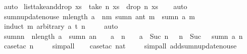 \begin{isabellebody}
\ auto%
\endisatagproof
{\isafoldproof}%
%
\isadelimproof
\isanewline
%
\endisadelimproof
\isanewline
{}\isamarkupfalse%
\ list{\isacharunderscore}take{\isacharunderscore}and{\isacharunderscore}drop{\isacharcolon}\ {\isachardoublequoteopen}xs\ {\isacharequal}\ take\ n\ xs\ {\isacharat}\ drop\ n\ xs{\isachardoublequoteclose}\isanewline
%
\isadelimproof
\ \ %
\endisadelimproof
%
\isatagproof
{}\isamarkupfalse%
\ auto%
\endisatagproof
{\isafoldproof}%
%
\isadelimproof
\isanewline
%
\endisadelimproof
\isanewline
{}\isamarkupfalse%
\ sumn{\isacharunderscore}update{\isacharunderscore}no{\isacharunderscore}use{\isacharcolon}\ {\isachardoublequoteopen}m{\isasymle}length\ a\ {\isasymLongrightarrow}\ n{\isasymge}m\ {\isasymLongrightarrow}sumn\ {\isacharparenleft}a{\isacharbrackleft}n{\isacharcolon}{\isacharequal}t{\isacharbrackright}{\isacharparenright}\ m\ {\isacharequal}\ sumn\ a\ m{\isachardoublequoteclose}\isanewline
%
\isadelimproof
\ \ %
\endisadelimproof
%
\isatagproof
{}\isamarkupfalse%
\ {\isacharparenleft}induct\ m\ arbitrary{\isacharcolon}\ a\ t\ n{\isacharparenright}\isanewline
\ \ \ \isamarkupfalse%
\ {\isacharparenleft}auto{\isacharparenright}\isanewline
\ \ \isamarkupfalse%
%
\endisatagproof
{\isafoldproof}%
%
\isadelimproof
\isanewline
%
\endisadelimproof
\isanewline
{}\isamarkupfalse%
\ sumn{}{\isacharcolon}{\isachardoublequoteopen}n{\isasymge}{}\ {\isasymLongrightarrow}\ n{\isasymle}length\ a\ {\isasymLongrightarrow}\ sumn\ {\isacharparenleft}a{\isacharbrackleft}n\ {\isacharminus}\ {}\ {\isacharcolon}{\isacharequal}\ a\ {\isacharbang}\ {\isacharparenleft}n\ {\isacharminus}\ {}{\isacharparenright}\ {\isacharplus}\ a\ {\isacharbang}\ Suc\ {\isacharparenleft}n\ {\isacharminus}\ {}{\isacharparenright}{\isacharbrackright}{\isacharparenright}\ {\isacharparenleft}n\ {\isacharminus}\ Suc\ {}{\isacharparenright}\ {\isacharequal}\ sumn\ a\ n{\isachardoublequoteclose}\isanewline
%
\isadelimproof
\ \ %
\endisadelimproof
%
\isatagproof
{}\isamarkupfalse%
\ {\isacharparenleft}case{\isacharunderscore}tac\ n{\isacharparenright}\isanewline
\ \ \ \isamarkupfalse%
\ simp{\isacharunderscore}all\isanewline
\ \ \isamarkupfalse%
\ {\isacharparenleft}case{\isacharunderscore}tac\ nat{\isacharparenright}\isanewline
\ \ \ \isamarkupfalse%
\ {\isacharparenleft}simp{\isacharunderscore}all\ add{\isacharcolon}sumn{\isacharunderscore}update{\isacharunderscore}no{\isacharunderscore}use{\isacharparenright}\isanewline

\end{isabellebody}
